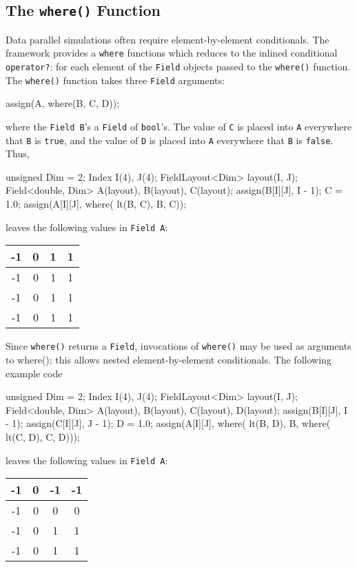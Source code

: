 \subsection{The \texttt{where()} Function}

Data parallel simulations often require element-by-element conditionals. The \ippl framework provides a \texttt{where} functions which reduces to the inlined conditional \texttt{operator?}: for each element of the \texttt{Field} objects passed to the \texttt{where()} function. The \texttt{where()} function takes three \texttt{Field} arguments:
\begin{smallcode}
assign(A, where(B, C, D));
\end{smallcode}
where the \texttt{Field B}'s a \texttt{Field} of \texttt{bool}'s. The value of \texttt{C} is placed into \texttt{A} everywhere that \texttt{B} is \texttt{true}, and the value of \texttt{D} is placed into \texttt{A} everywhere that \texttt{B} is \texttt{false}. Thus, \\
\begin{code}
unsigned Dim = 2;
Index I(4), J(4);
FieldLayout<Dim> layout(I, J);
Field<double, Dim> A(layout), B(layout), C(layout);
assign(B[I][J], I - 1);
C = 1.0;
assign(A[I][J], where( lt(B, C), B, C));
\end{code}
leaves the following values in \texttt{Field A}:
%
   \begin{center}
        \begin{tabular}{|c|c|c|c|}
        \hline
        -1 & 0 & 1 & 1 \\        \hline
        -1 & 0 & 1 & 1 \\        \hline
        -1 & 0 & 1 & 1 \\        \hline
        -1 & 0 & 1 & 1  \\        \hline
        \end{tabular}
   \end{center}

Since \texttt{where()} returns a \texttt{Field}, invocations of \texttt{where()} may be used as arguments to where(); this allows nested element-by-element conditionals. The following example code\\
\begin{code}
unsigned Dim = 2;
Index I(4), J(4);
FieldLayout<Dim> layout(I, J);
Field<double, Dim> A(layout), B(layout), C(layout), D(layout);
assign(B[I][J], I - 1);
assign(C[I][J], J - 1);
D = 1.0;
assign(A[I][J], where( lt(B, D), B, where( lt(C, D), C, D)));
\end{code}
leaves the following values in \texttt{Field A}:
%
   \begin{center}
        \begin{tabular}{|c|c|c|c|}
        \hline
        -1 & 0 & -1 & -1 \\        \hline
        -1 & 0 & 0 & 0 \\        \hline
        -1 & 0 & 1 & 1 \\        \hline
        -1 & 0 & 1 & 1  \\        \hline
        \end{tabular}
   \end{center}

